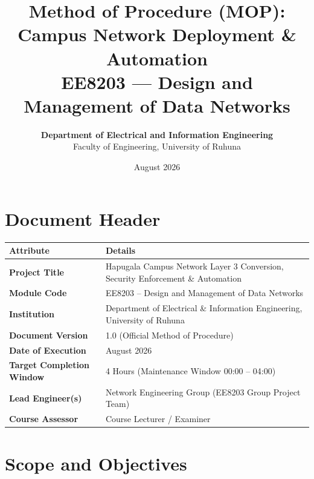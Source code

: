 \documentclass[11pt,a4paper]{article}
\title{
    \vspace{-1.5cm}
    \LARGE \textbf{Method of Procedure (MOP): Campus Network Deployment \& Automation} \\[0.3cm]
    \Large \textbf{EE8203 — Design and Management of Data Networks}
    \vspace{0.2cm}
}
\author{\textbf{Department of Electrical and Information Engineering} \\ Faculty of Engineering, University of Ruhuna}
\date{August 2026}
\newcommand{\hr}{\vspace{0.2cm}\noindent\hrulefill\vspace{0.2cm}}
\begin{document}
\maketitle

\section{Document Header}

\begin{table}[htbp]
\centering
\begin{tabular}{|p{}|p{}|}
\hline
\textbf{Attribute} & \textbf{Details} \\
\hline
\textbf{Project Title} & Hapugala Campus Network Layer 3 Conversion, Security Enforcement \& Automation \\
\textbf{Module Code} & EE8203 -- Design and Management of Data Networks \\
\textbf{Institution} & Department of Electrical \& Information Engineering, University of Ruhuna \\
\textbf{Document Version} & 1.0 (Official Method of Procedure) \\
\textbf{Date of Execution} & August 2026 \\
\textbf{Target Completion Window} & 4 Hours (Maintenance Window 00:00 -- 04:00) \\
\textbf{Lead Engineer(s)} & Network Engineering Group (EE8203 Group Project Team) \\
\textbf{Course Assessor} & Course Lecturer / Examiner \\
\hline
\end{tabular}
\end{table}

\hr

\section{Scope and Objectives}
\end{document}
